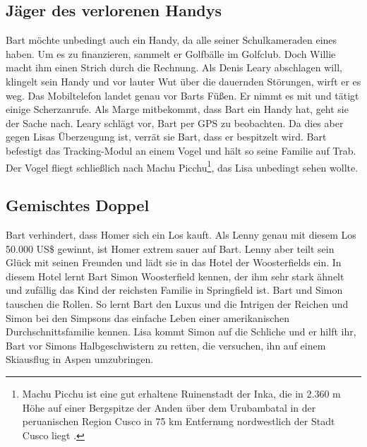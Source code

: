 \subsection{Jäger des verlorenen Handys}\label{KABF15}
Bart möchte unbedingt auch ein Handy, da alle seiner Schulkameraden eines haben. Um es zu finanzieren, sammelt er Golfbälle im Golfclub. Doch Willie macht ihm einen Strich durch die Rechnung. Als Denis Leary abschlagen will, klingelt sein Handy und vor lauter Wut über die dauernden Störungen, wirft er es weg. Das Mobiltelefon landet genau vor Barts Füßen. Er nimmt es mit und tätigt einige Scherzanrufe. Als Marge mitbekommt, dass Bart ein Handy hat, geht sie der Sache nach. Leary schlägt vor, Bart per GPS zu beobachten. Da dies aber gegen Lisas Überzeugung ist, verrät sie Bart, dass er bespitzelt wird. Bart befestigt das Tracking-Modul an einem Vogel und hält so seine Familie auf Trab. Der Vogel fliegt schließlich nach Machu Picchu\footnote{Machu Picchu ist eine gut erhaltene Ruinenstadt der Inka, die in 2.360 m Höhe auf einer Bergspitze der Anden über dem Urubambatal in der peruanischen Region Cusco in 75 km Entfernung nordwestlich der Stadt Cusco liegt \cite{WikiMachuPicchu}.}, das Lisa unbedingt sehen wollte.


\subsection{Gemischtes Doppel}
Bart verhindert, dass Homer sich ein Los kauft. Als Lenny genau mit diesem Los 50.000 US\$ gewinnt, ist Homer extrem sauer auf Bart. Lenny aber teilt sein Glück mit seinen Freunden und lädt sie in das Hotel der Woosterfields ein. In diesem Hotel lernt Bart Simon Woosterfield kennen, der ihm sehr stark ähnelt und zufällig das Kind der reichsten Familie in Springfield ist. Bart und Simon tauschen die Rollen. So lernt Bart den Luxus und die Intrigen der Reichen und Simon bei den Simpsons das einfache Leben einer amerikanischen Durchschnittsfamilie kennen. Lisa kommt Simon auf die Schliche und er hilft ihr, Bart vor Simons Halbgeschwistern zu retten, die versuchen, ihn auf einem Skiausflug in Aspen umzubringen. 

